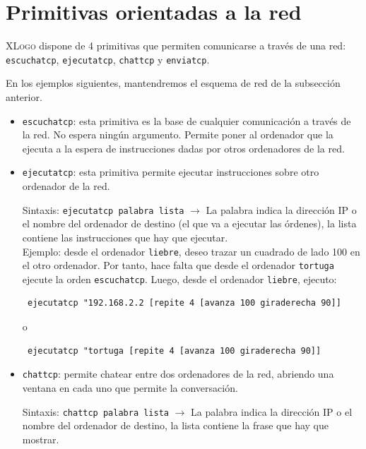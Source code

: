 \section{Primitivas orientadas a la red}
  \label{Red_Primitivas}
\textsc{XLogo} dispone de 4 primitivas que permiten comunicarse a trav\'es de
una red: \texttt{escuchatcp}, \texttt{ejecutatcp}, \texttt{chattcp} y
\texttt{enviatcp}. 

En los ejemplos siguientes, mantendremos el esquema de red de la subsecci\'on
anterior.
\begin{itemize}
   \item \texttt{escuchatcp}:  esta
      primitiva es la base de cualquier comunicaci\'on a trav\'es de la red.
      No espera ning\'un argumento. Permite poner al ordenador que la ejecuta
      a la espera de instrucciones dadas por otros ordenadores de la red.
   \item \texttt{ejecutatcp}:  esta
      primitiva permite ejecutar instrucciones sobre otro ordenador de la red.

      Sintaxis: \texttt{ejecutatcp palabra lista} $\rightarrow$ La palabra indica
      la direcci\'on IP o el nombre del ordenador de destino (el que va a
      ejecutar las \'ordenes), la lista contiene las instrucciones que hay
      que ejecutar. \\

      Ejemplo: desde el ordenador \texttt{liebre}, deseo trazar un cuadrado
      de lado 100 en el otro ordenador. Por tanto, hace falta que desde el
      ordenador \texttt{tortuga} ejecute la orden \texttt{escuchatcp}. Luego,
      desde el ordenador \texttt{liebre}, ejecuto:
      \begin{verbatim}
 ejecutatcp "192.168.2.2 [repite 4 [avanza 100 giraderecha 90]] \end{verbatim}
      o
      \begin{verbatim}
 ejecutatcp "tortuga [repite 4 [avanza 100 giraderecha 90]] \end{verbatim}

   \item \texttt{chattcp}:  permite chatear
      entre dos ordenadores de la red, abriendo una ventana en cada uno que
      permite la conversaci\'on.

      Sintaxis: \texttt{chattcp palabra lista} $\rightarrow$ La palabra indica la
      direcci\'on IP o el nombre del ordenador de destino, la lista contiene
      la frase que hay que mostrar.


\end{itemize}
